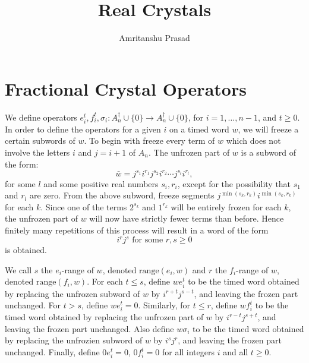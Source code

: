 \documentclass[12pt]{amsproc}
\title{Real Crystals}
\author{Amritanshu Prasad}
\newcommand{\range}{\mathrm{range}}
\theoremstyle{definition}
\begin{document}
\maketitle

\section{Fractional Crystal Operators}
\label{sec:frac-ops}
We define operators $e_i^t, f_i^t, \sigma_i:A_n^\dagger\cup \{0\}\to A_n^\dagger\cup \{0\}$, for $i=1,\dotsc,n-1$, and $t\geq 0$.
In order to define the operators for a given $i$ on a timed word $w$, we will freeze a certain subwords of $w$.
To begin with freeze every term of $w$ which does not involve the letters $i$ and $j=i+1$ of $A_n$.
The unfrozen part of $w$ is a subword of the form:
\begin{displaymath}
  \bar w = j^{s_1}i^{r_1}j^{s_2}i^{r_2}\dotsb j^{s_l}i^{r_l},
\end{displaymath}
for some $l$ and some positive real numbers $s_i, r_i$, except for the possibility that $s_1$ and $r_l$ are zero.
From the above subword, freeze segments $j^{\min(s_k,r_k)}i^{\min(s_k,r_k)}$ for each $k$.
Since one of the terms $2^{s_k}$ and $1^{r_k}$ will be entirely frozen for each $k$, the unfrozen part of $w$ will now have strictly fewer terms than before.
Hence finitely many repetitions of this process will result in a word of the form
\begin{displaymath}
  i^rj^s \text{ for some }r,s\geq 0
\end{displaymath}
is obtained.

We call $s$ the $e_i$-range of $w$, denoted $\range(e_i,w)$ and $r$ the $f_i$-range of $w$, denoted $\range(f_i,w)$.
For each $t\leq s$, define $we_i^t$ to be the timed word obtained by replacing the unfrozen subword of $w$ by $i^{r+t}j^{s-t}$, and leaving the frozen part unchanged.
For $t>s$, define $we_i^t=0$.
Similarly, for $t\leq r$, define $wf_i^t$ to be the timed word obtained by replacing the unfrozen part of $w$ by $i^{r-t}j^{s+t}$, and leaving the frozen part unchanged.
Also define $w\sigma_i$ to be the timed word obtained by replacing the unfrozien subword of $w$ by $i^sj^r$, and leaving the frozen part unchanged.
Finally, define $0e_i^t=0$, $0f_i^t=0$ for all integers $i$ and all $t\geq 0$.
\end{document}
